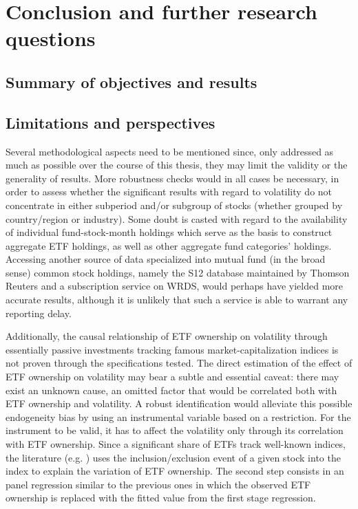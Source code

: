 \section{Conclusion and further research questions}
\label{sec:Conclusion}
\subsection{Summary of objectives and results}
\subsection{Limitations and perspectives}
Several methodological aspects need to be mentioned since, only addressed as much as possible over the course of this thesis, they may limit the validity or the generality of results. More robustness checks would in all cases be necessary, in order to assess whether the significant results with regard to volatility do not concentrate in either subperiod and/or subgroup of stocks (whether grouped by country/region or industry). Some doubt is casted with regard to the availability of individual fund-stock-month holdings which serve as the basis to construct aggregate ETF holdings, as well as other aggregate fund categories' holdings. Accessing another source of data specialized into mutual fund (in the broad sense) common stock holdings, namely the S12 database maintained by Thomson Reuters and a subscription service on WRDS, would perhaps have yielded more accurate results, although it is unlikely that such a service is able to warrant any reporting delay.

Additionally, the causal relationship of ETF ownership on volatility through essentially passive investments tracking famous market-capitalization indices is not proven through the specifications tested. The direct estimation of the effect of ETF ownership on volatility may bear a subtle and essential caveat: there may exist an unknown cause, an omitted factor that would be correlated both with ETF ownership and volatility. A robust identification would alleviate this possible endogeneity bias by using an instrumental variable based on a restriction. For the instrument to be valid, it has to affect the volatility only through its correlation with ETF ownership. Since a significant share of ETFs track well-known indices, the literature (e.g. \textcite{Ben-David2018}) uses the inclusion/exclusion event of a given stock into the index to explain the variation of ETF ownership. The second step consists in an panel regression similar to the previous ones in which the observed ETF ownership is replaced with the fitted value from the first stage regression.

